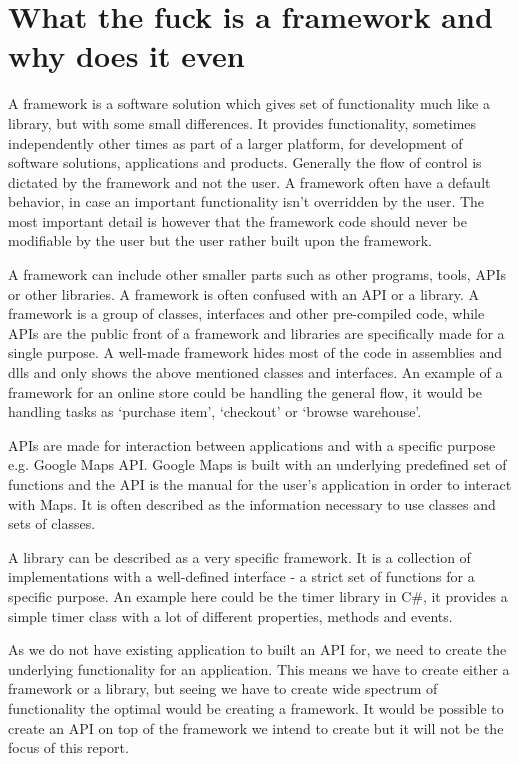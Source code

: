 \section{What the fuck is a framework and why does it even}

A framework is a software solution which gives set of functionality much like a library, but with some small differences. It provides functionality, sometimes independently other times as part of a larger platform, for development of software solutions, applications and products.
Generally the flow of control is dictated by the framework and not the user. A framework often have a default behavior, in case an important functionality isn't overridden by the user. The most important detail is however that the framework code should never be modifiable by the user but the user rather built upon the framework. \cite{framework}

A framework can include other smaller parts such as other programs, tools, APIs or other libraries. A framework is often confused with an API or a library. A framework is a group of classes, interfaces and other pre-compiled code, while APIs are the public front of a framework and libraries are specifically made for a single purpose. A well-made framework hides most of the code in assemblies and dlls and only shows the above mentioned classes and interfaces. An example of a framework for an online store could be handling the general flow, it would be handling tasks as `purchase item', `checkout' or `browse warehouse'.

APIs are made for interaction between applications and with a specific purpose e.g. Google Maps API. Google Maps is built with an underlying predefined set of functions and the API is the manual for the user's application in order to interact with Maps. It is often described as the information necessary to use classes and sets of classes.

A library can be described as a very specific framework. It is a collection of implementations with a well-defined interface - a strict set of functions for a specific purpose. An example here could be the timer library in C\#, it provides a simple timer class with a lot of different properties, methods and events.

As we do not have existing application to built an API for, we need to create the underlying functionality for an application. This means we have to create either a framework or a library, but seeing we have to create wide spectrum of functionality the optimal would be creating a framework. It would be possible to create an API on top of the framework we intend to create but it will not be the focus of this report.